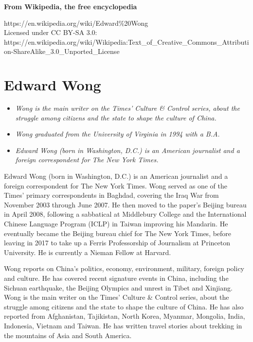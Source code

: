 \textbf{From Wikipedia, the free encyclopedia}

https://en.wikipedia.org/wiki/Edward\%20Wong\\
Licensed under CC BY-SA 3.0:\\
https://en.wikipedia.org/wiki/Wikipedia:Text\_of\_Creative\_Commons\_Attribution-ShareAlike\_3.0\_Unported\_License

\section{Edward Wong}\label{edward-wong}

\begin{itemize}
\item
  \emph{Wong is the main writer on the Times' Culture \& Control series,
  about the struggle among citizens and the state to shape the culture
  of China.}
\item
  \emph{Wong graduated from the University of Virginia in 1994 with a
  B.A.}
\item
  \emph{Edward Wong (born in Washington, D.C.) is an American journalist
  and a foreign correspondent for The New York Times.}
\end{itemize}

Edward Wong (born in Washington, D.C.) is an American journalist and a
foreign correspondent for The New York Times. Wong served as one of the
Times' primary correspondents in Baghdad, covering the Iraq War from
November 2003 through June 2007. He then moved to the paper's Beijing
bureau in April 2008, following a sabbatical at Middlebury College and
the International Chinese Language Program (ICLP) in Taiwan improving
his Mandarin. He eventually became the Beijing bureau chief for The New
York Times, before leaving in 2017 to take up a Ferris Professorship of
Journalism at Princeton University. He is currently a Nieman Fellow at
Harvard.

Wong reports on China's politics, economy, environment, military,
foreign policy and culture. He has covered recent signature events in
China, including the Sichuan earthquake, the Beijing Olympics and unrest
in Tibet and Xinjiang. Wong is the main writer on the Times' Culture \&
Control series, about the struggle among citizens and the state to shape
the culture of China. He has also reported from Afghanistan, Tajikistan,
North Korea, Myanmar, Mongolia, India, Indonesia, Vietnam and Taiwan. He
has written travel stories about trekking in the mountains of Asia and
South America.

